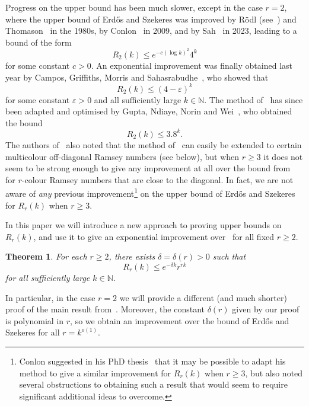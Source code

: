 \documentclass[12pt,reqno]{amsart}
\newtheorem{theorem}{Theorem}[section]
\theoremstyle{definition}
\theoremstyle{remark}
\newcommand\N{\mathbb{N}}
\newcommand\eps{\varepsilon}
\renewcommand{\le}{\leqslant}
\renewcommand{\ge}{\geqslant}
\def\eps{\varepsilon}
\def\N{\mathbb{N}}
\begin{document}
Progress on the upper bound has been much slower, except in the case \(r = 2\), where the upper bound of Erd\H{o}s and Szekeres was improved by R\"odl (see~\cite{GR}) and Thomason~\cite{T88} in the 1980s, by Conlon~\cite{C09} in 2009, and by Sah~\cite{S23} in 2023, leading to a bound of the form
%
\begin{equation*}
	R_2(k) \le e^{- c(\log k)^2} 4^k
\end{equation*}
%
for some constant \(c > 0\). An exponential improvement was finally obtained last year by Campos, Griffiths, Morris and Sahasrabudhe~\cite{CGMS}, who showed that
%
\begin{equation*}
	R_2(k) \le (4 - \eps)^k
\end{equation*}
%
for some constant \(\eps > 0\) and all sufficiently large \(k \in \N\). The method of~\cite{CGMS} has since been adapted and optimised by Gupta, Ndiaye, Norin and Wei~\cite{GNNW}, who obtained the bound
%
\begin{equation*}
	R_2(k) \le 3.8^k.
\end{equation*}
%
The authors of~\cite{GNNW} also noted that the method of~\cite{CGMS} can easily be extended to certain multicolour off-diagonal Ramsey numbers (see below), but when \(r \ge 3\) it does not seem to be strong enough to give any improvement at all over the
bound from~\cite{ESz35} for \(r\)-colour Ramsey numbers that are close to the diagonal. In fact, we are not aware of \emph{any} previous improvement\footnote{Conlon suggested in his PhD thesis~\cite[page~46]{CPhD} that it may be possible to adapt his method to give a similar improvement for \(R_r(k)\) when \(r \ge 3\), but also noted several obstructions to obtaining such a result that would seem to require significant additional ideas to overcome.}
on the upper bound of Erd\H{o}s and Szekeres for
\(R_r(k)\) when \(r \ge 3\).

In this paper we will introduce a new approach to proving upper bounds on \(R_r(k)\), and use it to give an exponential improvement over~\cite{ESz35} for all fixed \(r \ge 2\).

%
\begin{theorem}
	\label{thm:Ramsey:multicolour}
	For each \(r \ge 2\), there exists \(\delta = \delta(r) > 0\) such that
	\begin{equation*}
		R_r(k) \le e^{-\delta k} r^{rk}
	\end{equation*}
	for all sufficiently large \(k \in \N\).
\end{theorem}
%

In particular, in the case \(r = 2\) we will provide a different (and much shorter) proof of the main result from~\cite{CGMS}. Moreover, the constant \(\delta(r)\) given by our proof is polynomial in \(r\), so we obtain an improvement over the bound of Erd\H{o}s and Szekeres for all \(r = k^{o(1)}\).
\end{document}
